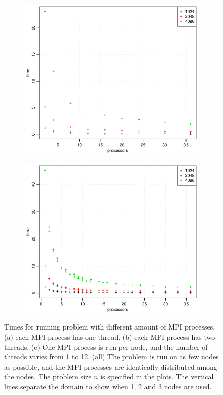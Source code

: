 \begin{figure}[h!]
\begin{subfigure}[b]{0.48\textwidth}
    \includegraphics[width=\textwidth]{./Figures/taskbTimeProc2.pdf}
    \caption{}
    \label{fig:time2}
  \end{subfigure}
  \quad
  \begin{subfigure}[b]{0.48\textwidth}
    \includegraphics[width=\textwidth]{./Figures/taskbTimeNodesTimesThreads.pdf}
    \caption{}
    \label{fig:time3}
  \end{subfigure}
  \vspace{-0.1\baselineskip}
  \caption{Times for running problem with different amount of MPI processes. (a) each MPI process has one thread. (b) each MPI process has two threads. (c) One MPI process is run per node, and the number of threads varies from 1 to 12. (all) The problem is run on as few nodes as possible, and the MPI processes are identically distributed among the nodes. The problem size $n$ is specified in the plots. The vertical lines separate the domain to show when 1, 2 and 3 nodes are used.}
  \label{fig:Times}
\end{figure}
%
\\
